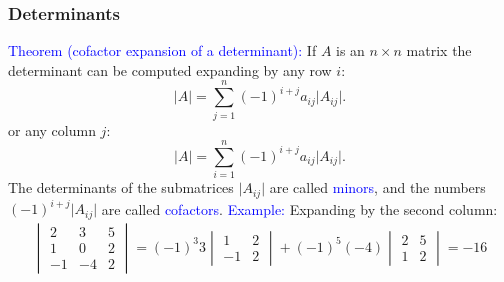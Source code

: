 \documentclass[11pt,aspectratio=169]{beamer}
\begin{document}
\begin{frame}
\frametitle{Determinants}
\begin{small}
\textcolor{blue}{Theorem (cofactor expansion of a determinant):} If $A$ is an $n \times n$ matrix the determinant can be computed expanding by any row $i$:
\begin{equation*}
\vert A \vert=\sum_{j=1}^n (-1)^{i+j} a_{ij} \vert A_{ij} \vert.
\end{equation*}
or any column $j$:
\begin{equation*}
\vert A \vert=\sum_{i=1}^n (-1)^{i+j} a_{ij} \vert A_{ij} \vert.
\end{equation*}
The determinants of the submatrices $\vert A_{ij} \vert$ are called \textcolor{blue}{minors}, and the numbers  $(-1)^{i+j} \vert A_{ij} \vert$ are called \textcolor{blue}{cofactors}.
\vskip 10pt
\textcolor{blue}{Example:} Expanding by the second column:
\begin{equation*} \begin{split}
 \begin{vmatrix}
2 & 3 & 5\\
1 & 0 & 2 \\
-1 & -4 & 2
\end{vmatrix}=(-1)^3 3\begin{vmatrix}
1& 2\\
-1& 2
\end{vmatrix} + (-1)^5 (-4) \begin{vmatrix}
2 & 5\\
1 & 2
\end{vmatrix}=-16
\end{split}
\end{equation*}


\end{small}
\end{frame}
\end{document}
